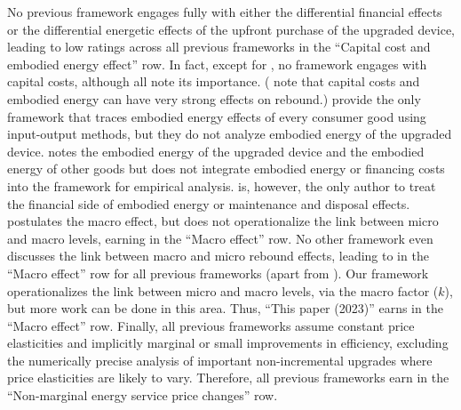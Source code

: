 \documentclass[12pt]{article}\usepackage[]{graphicx}\usepackage[]{xcolor}
\begin{document}
No previous framework engages fully with either the differential financial effects
or the differential energetic effects
of the upfront purchase of the upgraded device, 
leading to low ratings across all previous frameworks in the
``Capital cost and embodied energy effect'' row.
In fact, except for \citet{Nassen:2009aa},
no framework engages with capital costs, 
although all note its importance. 
(\citeauthor{Nassen:2009aa} note that 
capital costs and embodied energy can have very strong effects on rebound.)
\citet{Thomas:2013aa,Thomas:2013ab} provide the only framework 
that traces embodied energy effects
of every consumer good using input-output methods, but
they do not analyze embodied energy of the upgraded device.
\citet{Borenstein:2015aa} notes
the embodied energy of the upgraded device
and the embodied energy of other goods
but does not integrate embodied energy
or financing costs into the framework for empirical analysis. 
\citeauthor{Borenstein:2015aa} is, however, 
the only author to treat the financial side of 
embodied energy or maintenance and disposal effects. 
\citet{Borenstein:2015aa} postulates the macro effect, 
but does not operationalize the link between micro and macro levels, 
earning  in the ``Macro effect'' row. 
No other framework even discusses the link between macro and micro rebound effects, 
leading to  in the ``Macro effect'' row for all previous frameworks
(apart from \citet{Borenstein:2015aa}). 
Our framework operationalizes the link between micro and macro levels, 
via the macro factor ($k$), 
but more work can be done in this area.
Thus, ``This paper (2023)'' earns  in the ``Macro effect'' row.
Finally, all previous frameworks assume constant price elasticities and
implicitly marginal or small improvements in efficiency, 
excluding the numerically precise analysis of important non-incremental upgrades
where price elasticities are likely to vary. 
Therefore, all previous frameworks earn  in the 
``Non-marginal energy service price changes'' row.
\end{document}
